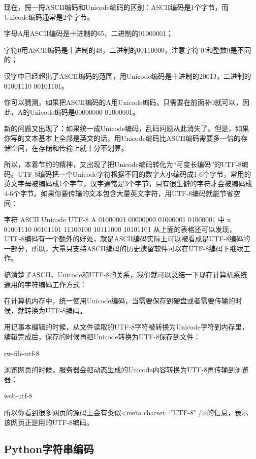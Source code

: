 现在，捋一捋ASCII编码和Unicode编码的区别：ASCII编码是1个字节，而Unicode编码通常是2个字节。

字母A用ASCII编码是十进制的65，二进制的01000001；

字符0用ASCII编码是十进制的48，二进制的00110000，注意字符'0'和整数0是不同的；

汉字中已经超出了ASCII编码的范围，用Unicode编码是十进制的20013，二进制的01001110 00101101。

你可以猜测，如果把ASCII编码的A用Unicode编码，只需要在前面补0就可以，因此，A的Unicode编码是00000000 01000001。

新的问题又出现了：如果统一成Unicode编码，乱码问题从此消失了。但是，如果你写的文本基本上全部是英文的话，用Unicode编码比ASCII编码需要多一倍的存储空间，在存储和传输上就十分不划算。

所以，本着节约的精神，又出现了把Unicode编码转化为“可变长编码”的UTF-8编码。UTF-8编码把一个Unicode字符根据不同的数字大小编码成1-6个字节，常用的英文字母被编码成1个字节，汉字通常是3个字节，只有很生僻的字符才会被编码成4-6个字节。如果你要传输的文本包含大量英文字符，用UTF-8编码就能节省空间：

字符	ASCII	Unicode	UTF-8
A	01000001	00000000 01000001	01000001
中	x	01001110 00101101	11100100 10111000 10101101
从上面的表格还可以发现，UTF-8编码有一个额外的好处，就是ASCII编码实际上可以被看成是UTF-8编码的一部分，所以，大量只支持ASCII编码的历史遗留软件可以在UTF-8编码下继续工作。

搞清楚了ASCII、Unicode和UTF-8的关系，我们就可以总结一下现在计算机系统通用的字符编码工作方式：

在计算机内存中，统一使用Unicode编码，当需要保存到硬盘或者需要传输的时候，就转换为UTF-8编码。

用记事本编辑的时候，从文件读取的UTF-8字符被转换为Unicode字符到内存里，编辑完成后，保存的时候再把Unicode转换为UTF-8保存到文件：

rw-file-utf-8

浏览网页的时候，服务器会把动态生成的Unicode内容转换为UTF-8再传输到浏览器：

web-utf-8

所以你看到很多网页的源码上会有类似<meta charset="UTF-8" />的信息，表示该网页正是用的UTF-8编码。






\subsection{}

\subsection{Python字符串编码}


